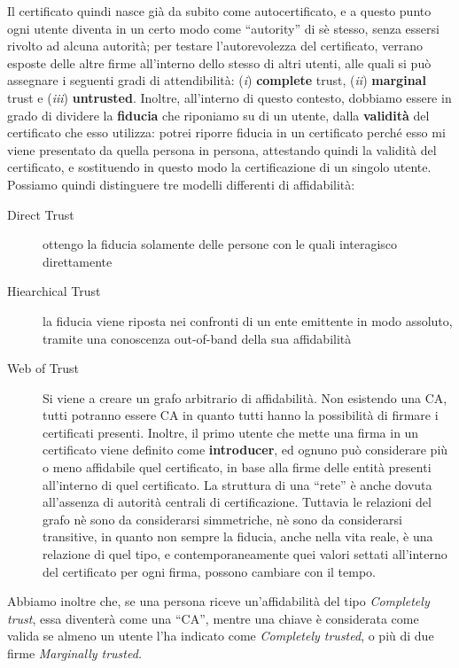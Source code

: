 Il certificato quindi nasce già da subito come autocertificato, e a questo 
punto ogni utente diventa in un certo modo come ``autority'' di sè stesso,
senza essersi rivolto ad alcuna autorità; per testare l'autorevolezza del certificato,
verrano esposte delle altre firme all'interno dello stesso di altri utenti, 
alle quali si può assegnare i seguenti gradi di attendibilità:
(\textit i) \textbf{complete} trust, (\textit{ii}) \textbf{marginal} trust e (\textit{iii})
\textbf{untrusted}. Inoltre, all'interno di questo contesto, dobbiamo essere in 
grado di dividere la \textbf{fiducia} che riponiamo su di un utente, dalla 
\textbf{validità} del certificato che esso utilizza: potrei riporre fiducia in un
certificato perché esso mi viene presentato da quella persona in persona,
attestando quindi la validità del certificato, e sostituendo in questo modo
la certificazione di un singolo utente. Possiamo quindi distinguere tre modelli 
differenti di affidabilità:
\begin{description}
\item[Direct Trust] ottengo la fiducia solamente delle persone con le quali
	interagisco direttamente
\item[Hiearchical Trust] la fiducia viene riposta nei confronti di un ente
	emittente in modo assoluto, tramite una conoscenza out-of-band della
	sua affidabilità
\item[Web of Trust] Si viene a creare un grafo arbitrario di affidabilità.
	Non esistendo una CA, tutti potranno essere CA in quanto tutti hanno la
	possibilità di firmare i certificati presenti. Inoltre, il primo 
	utente che mette una firma in un certificato viene definito come
	\textbf{introducer}, ed ognuno può considerare più o meno affidabile quel
	certificato, in base alla firme delle entità presenti all'interno di
	quel certificato. La struttura di una ``rete'' è anche dovuta all'assenza
	di autorità centrali di certificazione. Tuttavia le relazioni del grafo
	nè sono da considerarsi simmetriche, nè sono da considerarsi transitive,
	in quanto non sempre la fiducia, anche nella vita reale, è una relazione
	di quel tipo, e contemporaneamente quei valori settati all'interno del 
	certificato per ogni firma, possono cambiare con il tempo.
\end{description}

Abbiamo inoltre che, se una persona riceve un'affidabilità del tipo \textit{Completely
trust}, essa diventerà come una ``CA'', mentre una chiave è considerata come
valida se almeno un utente l'ha indicato come \textit{Completely trusted}, o più di
due firme \textit{Marginally trusted.}

